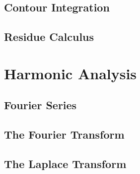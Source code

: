 \documentclass[a4paper]{article}
\numberwithin{equation}{subsection}
\theoremstyle{definition}
\theoremstyle{remark}
\begin{document}
\subsection{Contour Integration}
\subsection{Residue Calculus}
\section{Harmonic Analysis}
\label{HarmonicAnalysis}
\subsection{Fourier Series}
\subsection{The Fourier Transform}
\subsection{The Laplace Transform}
\end{document}
